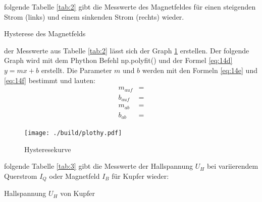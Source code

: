 
\justifying folgende Tabelle \ref{tab:2} gibt die Messwerte des Magnetfeldes für einen steigenden Strom (links) und einem 
sinkenden Strom (rechts) wieder. 

\begin{table}[H]
    \centering
    
    \caption{Hysterese des Magnetfelds}
    \label{tab:2}
\end{table}

\justifying der Messwerte aus Tabelle \ref{tab:2} lässt sich der Graph \ref{fig:2} erstellen. Der folgende Graph wird 
mit dem Phython Befehl np.polyfit() \cite{numpy} und der Formel \eqref{eq:14d} $y = mx + b$ erstellt. Die Parameter $m$ und $b$ werden mit 
den Formeln \eqref{eq:14e} und \eqref{eq:14f} bestimmt und lauten:
\begin{subequations}
\begin{align}
    m_{auf} &= \text{} \label{eq:16a}\\
    b_{auf} &= \text{} \label{eq:16b}\\
    m_{ab}  &= \text{}  \label{eq:16c}\\
    b_{ab}  &= \text{}  \label{eq:16d}
\end{align}
\end{subequations}

\begin{figure}[H]
\centering
\texttt{[image: ./build/plothy.pdf]}
\caption{Hysteresekurve}
\label{fig:2}
\end{figure}


\justifying folgende Tabelle \ref{tab:3} gibt die Messwerte der Hallspannung $U_H$ bei variierendem Querstrom $I_Q$ oder Magnetfeld
$I_B$ für Kupfer wieder:

\begin{table}[H]
    \centering
    
    \caption{Hallspannung $U_H$ von Kupfer}
    \label{tab:3}
\end{table}

